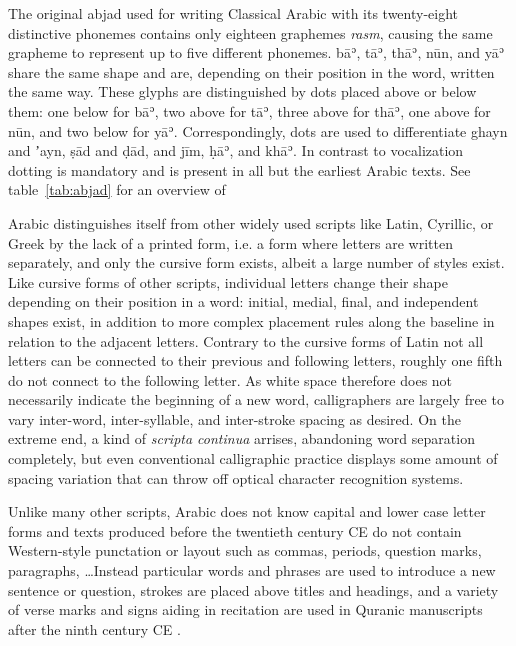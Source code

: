 The original abjad used for writing Classical Arabic with its twenty-eight
distinctive phonemes contains only eighteen graphemes \emph{rasm}, causing the
same grapheme to represent up to five different phonemes. bāʾ, tāʾ, thāʾ, nūn,
and yāʾ share the same shape and are, depending on their position in the word,
written the same way. These glyphs are distinguished by dots placed above or
below them: one below for bāʾ, two above for tāʾ, three above for thāʾ, one
above for nūn, and two below for yāʾ. Correspondingly, dots are used to
differentiate ghayn and ʼayn, ṣād and ḍād, and jīm, ḥāʾ, and khāʾ. In contrast
to vocalization dotting is mandatory and is present in all but the earliest
Arabic texts. See table~\ref{tab:abjad} for an overview of 

Arabic distinguishes itself from other widely used scripts like Latin,
Cyrillic, or Greek by the lack of a printed form, i.e. a form where letters are
written separately, and only the cursive form exists, albeit a large number of
styles exist. Like cursive forms of other scripts, individual letters change
their shape depending on their position in a word: initial, medial, final, and
independent shapes exist, in addition to more complex placement rules along the
baseline in relation to the adjacent letters. Contrary to the cursive forms of
Latin not all letters can be connected to their previous and following letters,
roughly one fifth do not connect to the following letter. As white space
therefore does not necessarily indicate the beginning of a new word,
calligraphers are largely free to vary inter-word, inter-syllable, and
inter-stroke spacing as desired. On the extreme end, a kind of \emph{scripta
continua} arrises\cite[pg. 15]{blair2006islamic}, abandoning word separation
completely, but even conventional calligraphic practice displays some amount of
spacing variation that can throw off optical character recognition systems.

Unlike many other scripts, Arabic does not know capital and lower case letter
forms and texts produced before the twentieth century CE do not contain
Western-style punctation or layout such as commas, periods, question marks,
paragraphs, \dots Instead particular words and phrases are used to introduce a
new sentence or question, strokes are placed above titles and headings, and a
variety of verse marks and signs aiding in recitation are used in Quranic
manuscripts after the ninth century CE \cite{awad2015evolution}.

